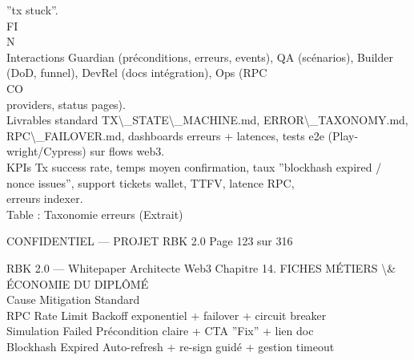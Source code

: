 \documentclass[12pt,landscape,a4paper]{article}
\newenvironment{confidential}
{\begin{tcolorbox}[
    colback=rbkred!5!white,
    colframe=rbkred!75!black,
    title=CONFIDENTIEL,
    fonttitle=\bfseries\color{white},
    coltitle=rbkred!75!black,
    breakable,
    enhanced,
    frame hidden,
    borderline west={2pt}{0pt}{rbkred!75!black}
]}
{\end{tcolorbox}}
\begin{document}
”tx stuck”.\\
\vspace{0.5em}
\vspace{0.5em}
\vspace{0.5em}
\vspace{0.5em}
FI\\
N\\
Interactions Guardian (préconditions, erreurs, events), QA (scénarios), Builder (DoD, funnel), DevRel (docs intégration), Ops (RPC\\
CO\\
providers, status pages).\\
\vspace{0.5em}
Livrables standard TX\textbackslash{}_STATE\textbackslash{}_MACHINE.md, ERROR\textbackslash{}_TAXONOMY.md, RPC\textbackslash{}_FAILOVER.md, dashboards erreurs + latences, tests e2e (Play-\\
wright/Cypress) sur flows web3.\\
\vspace{0.5em}
KPIs Tx success rate, temps moyen confirmation, taux ”blockhash expired / nonce issues”, support tickets wallet, TTFV, latence RPC,\\
erreurs indexer.\\
\vspace{0.5em}
Table : Taxonomie erreurs (Extrait)\\
\vspace{0.5em}
\vspace{0.5em}
\vspace{0.5em}
\vspace{0.5em}
\begin{confidential}CONFIDENTIEL — PROJET RBK 2.0                               Page 123 sur 316\end{confidential}
RBK 2.0 — Whitepaper Architecte Web3                                                Chapitre 14. FICHES MÉTIERS \textbackslash{}& ÉCONOMIE DU DIPLÔMÉ\\
\vspace{0.5em}
\vspace{0.5em}
\vspace{0.5em}
Cause                   Mitigation Standard\\
RPC Rate Limit          Backoff exponentiel + failover + circuit breaker\\
Simulation Failed       Précondition claire + CTA ”Fix” + lien doc\\
Blockhash Expired       Auto-refresh + re-sign guidé + gestion timeout\\
\end{document}
